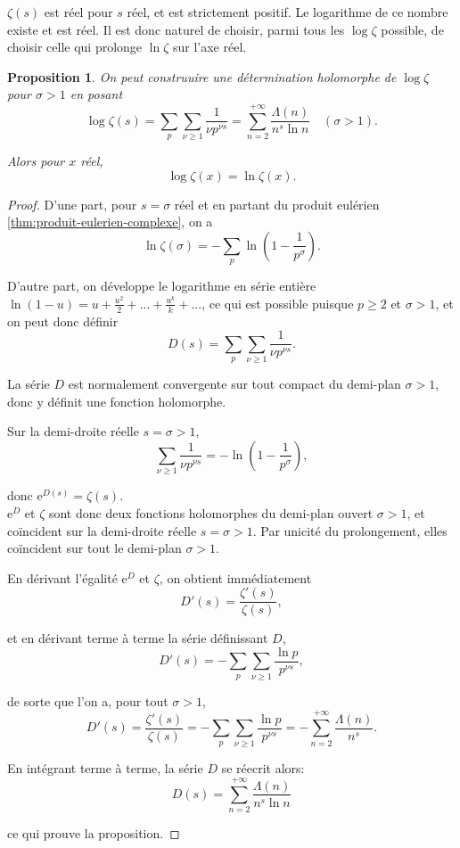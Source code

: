 \documentclass[french]{report}
\newtheorem{proposition}[theorem]{Proposition}
\begin{document}
$\zeta(s)$ est réel pour $s$ réel, et est strictement positif. Le logarithme de ce nombre existe et est réel. Il est donc naturel de choisir, parmi tous les $\log\zeta$ possible, de choisir celle qui prolonge $\ln\zeta$ sur l'axe réel.

\begin{proposition}\label{prop:log-zeta}
  On peut construuire une détermination holomorphe de $\log\zeta$ pour $\sigma>1$ en posant
  \[
    \log\zeta(s)
    = \sum_p\sum_{\nu\geq1}\frac{1}{\nu p^{\nu s}}
    = \sum_{n=2}^{+\infty}\frac{\Lambda(n)}{n^s\ln n}\quad(\sigma>1).
  \]

  Alors pour $x$ réel,
  \[ \log\zeta(x) = \ln\zeta(x). \]
\end{proposition}

\begin{proof}
  D'une part, pour $s=\sigma$ réel et en partant du produit eulérien \ref{thm:produit-eulerien-complexe}, on a
  \[ \ln\zeta(\sigma) = -\sum_p\ln\left(1-\frac{1}{p^\sigma}\right). \]

  D'autre part, on développe le logarithme en série entière $\ln(1-u)=u+\frac{u^2}{2}+...+\frac{u^k}{k}+...$, ce qui est possible puisque $p\geq2$ et $\sigma>1$, et on peut donc définir
  \[ D(s) = \sum_p\sum_{\nu\geq1}\frac{1}{\nu p^{\nu s}}. \]
  
  La série $D$ est normalement convergente sur tout compact du demi-plan $\sigma>1$, donc y définit une fonction holomorphe.

  Sur la demi-droite réelle $s=\sigma>1$,
  \[ \sum_{\nu\geq1}\frac{1}{\nu p^{\nu s}} = -\ln\left(1-\frac{1}{p^\sigma}\right), \]

  donc $\mathrm{e}^{D(s)}=\zeta(s)$.
  \\
  
  $\mathrm{e}^D$ et $\zeta$ sont donc deux fonctions holomorphes du demi-plan ouvert $\sigma>1$, et coïncident sur la demi-droite réelle $s=\sigma>1$. Par unicité du prolongement, elles coïncident sur tout le demi-plan $\sigma>1$.

  En dérivant l'égalité $\mathrm{e}^D$ et $\zeta$, on obtient immédiatement
  \[ D'(s)=\frac{\zeta'(s)}{\zeta(s)}, \]
  
  et en dérivant terme à terme la série définissant $D$, 
  \[ D'(s) = -\sum_p\sum_{\nu\geq1}\frac{\ln p}{p^{\nu s}}, \]

  de sorte que l'on a, pour tout $\sigma>1$,
  \[
    D'(s)
    = \frac{\zeta'(s)}{\zeta(s)}
    = -\sum_p\sum_{\nu\geq1}\frac{\ln p}{p^{\nu s}}
    = -\sum_{n=2}^{+\infty}\frac{\Lambda(n)}{n^s}.
  \]

  En intégrant terme à terme, la série $D$ se réecrit alors:
  \[ D(s) = \sum_{n=2}^{+\infty}\frac{\Lambda(n)}{n^s\ln n} \]

  ce qui prouve la proposition.
\end{proof}
\end{document}
